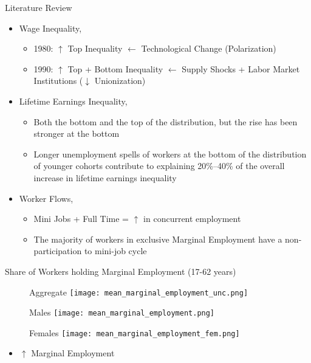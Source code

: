 \documentclass{beamer}
\let\oldcite=\cite
\renewcommand{\cite}[1]{\textcolor[rgb]{.0,.2,.7}{\oldcite{#1}}}
\begin{document}
\begin{frame}{Literature Review}\label{Literature}
\begin{itemize}
\setlength{\itemsep}{0.2 cm}
\item Wage Inequality, \cite{DuLuSc09}
\begin{itemize}
\setlength{\itemsep}{0.2 cm}
\item 1980: $\uparrow$ Top Inequality $\leftarrow$ Technological Change (Polarization)
\item 1990: $\uparrow$ Top + Bottom Inequality $\leftarrow$ Supply Shocks + Labor Market Institutions ($\downarrow$ Unionization)
\end{itemize}
\item Lifetime Earnings Inequality, \cite{BoCo15}
\begin{itemize}
\setlength{\itemsep}{0.2 cm}
\item Both the bottom and the top of the distribution, but the rise has been
stronger at the bottom
\item Longer unemployment spells of workers at the bottom of the
distribution of younger cohorts contribute to explaining 20\%–40\%
of the overall increase in lifetime earnings inequality
\end{itemize}
\item Worker Flows, \cite{CarriTuRo15}
\begin{itemize}
\setlength{\itemsep}{0.2 cm} 
\item Mini Jobs + Full Time = $\uparrow$ in concurrent employment
\item The majority of workers in exclusive Marginal Employment have a non-participation to mini-job cycle
\end{itemize}
\end{itemize}
\hyperlink{Motivation_1}{}
\end{frame}

\begin{frame}{Share of Workers holding Marginal Employment (17-62 years)}\label{Share_Marginal_Employment}
\begin{figure}[!t]
\centering
\begin{minipage}[b]{0.32\textwidth}{Aggregate}
\centering
\texttt{[image: mean\_marginal\_employment\_unc.png]}
\end{minipage}
\begin{minipage}[b]{0.32\textwidth}{Males}
\centering
\texttt{[image: mean\_marginal\_employment.png]}
\end{minipage}
\begin{minipage}[b]{0.32\textwidth}{Females}
\centering
\texttt{[image: mean\_marginal\_employment\_fem.png]}
\end{minipage}
\end{figure}
\begin{itemize}
\setlength{\itemsep}{0.7 cm}
\item $\uparrow$ Marginal Employment
\end{itemize}
\hyperlink{Marginal_Employment}{}
\end{frame}
\end{document}
